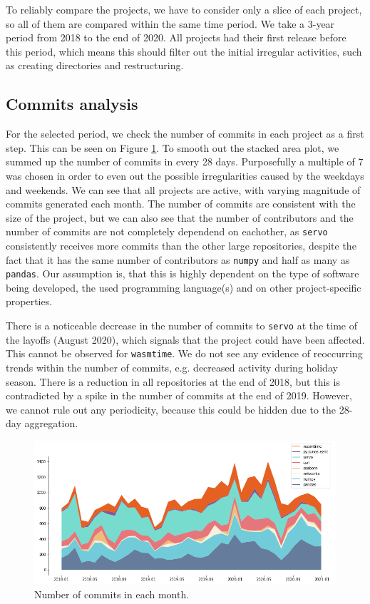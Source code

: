 To reliably compare the projects, we have to consider only a slice of each project, so all of them are compared within the same time period. We take a 3-year period from 2018 to the end of 2020. All projects had their first release before this period, which means this should filter out the initial irregular activities, such as creating directories and restructuring.

\subsection{Commits analysis}

For the selected period, we check the number of commits in each project as a first step. This can be seen on Figure \ref{fig:commits}. To smooth out the stacked area plot, we summed up the number of commits in every 28 days. Purposefully a multiple of 7 was chosen in order to even out the possible irregularities caused by the weekdays and weekends. We can see that all projects are active, with varying magnitude of commits generated each month. The number of commits are consistent with the size of the project, but we can also see that the number of contributors and the number of commits are not completely dependend on eachother, as \texttt{servo} consistently receives more commits than the other large repositories, despite the fact that it has the same number of contributors as \texttt{numpy} and half as many as \texttt{pandas}. Our assumption is, that this is highly dependent on the type of software being developed, the used programming language(s) and on other project-specific properties.

There is a noticeable decrease in the number of commits to \texttt{servo} at the time of the layoffs (August 2020), which signals that the project could have been affected. This cannot be observed for \texttt{wasmtime}. We do not see any evidence of reoccurring trends within the number of commits, e.g. decreased activity during holiday season. There is a reduction in all repositories at the end of 2018, but this is contradicted by a spike in the number of commits at the end of 2019. However, we cannot rule out any periodicity, because this could be hidden due to the 28-day aggregation.

\begin{figure}
    \centering
    \includegraphics[width=\textwidth]{figures/commits.png}
    \caption{Number of commits in each month.}
    \label{fig:commits}
\end{figure}

